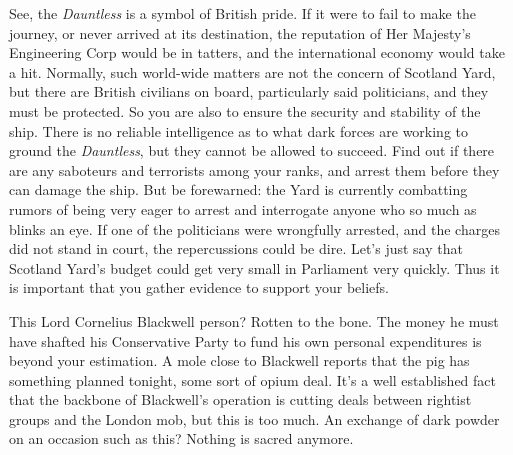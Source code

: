 \documentclass[char]{airship}
\begin{document}
See, the {\it Dauntless} is a symbol of British pride. If it were to fail to make the journey, or never arrived at its destination, the reputation of Her Majesty's Engineering Corp would be in tatters, and the international economy would take a hit. Normally, such world-wide matters are not the concern of Scotland Yard, but there are British civilians on board, particularly said politicians, and they must be protected. So you are also to ensure the security and stability of the ship. There is no reliable intelligence as to what dark forces are working to ground the {\it Dauntless}, but they cannot be allowed to succeed. Find out if there are any saboteurs and terrorists among your ranks, and arrest them before they can damage the ship. But be forewarned: the Yard is currently combatting rumors of being very eager to arrest and interrogate anyone who so much as blinks an eye. If one of the politicians were wrongfully arrested, and the charges did not stand in court, the repercussions could be dire. Let's just say that Scotland Yard's budget could get very small in Parliament very quickly. Thus it is important that you gather evidence to support your beliefs.

This Lord Cornelius Blackwell person? Rotten to the bone. The money he must have shafted his Conservative Party to fund his own personal expenditures is beyond your estimation. A mole close to Blackwell reports that the pig has something planned tonight, some sort of opium deal. It's a well established fact that the backbone of Blackwell's operation is cutting deals between rightist groups and the London mob, but this is too much. An exchange of dark powder on an occasion such as this? Nothing is sacred anymore.
\end{document}
